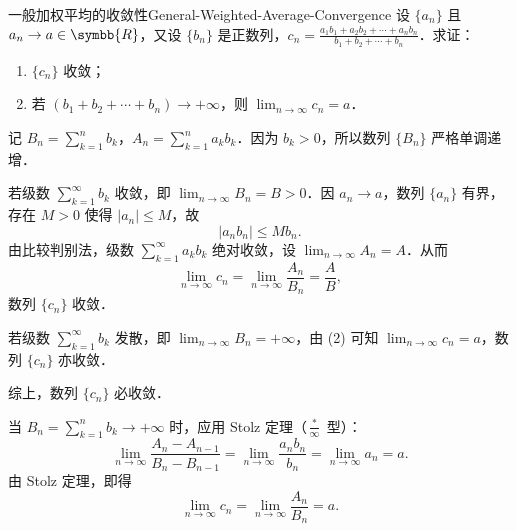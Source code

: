 \begin{problem}{一般加权平均的收敛性}{General-Weighted-Average-Convergence}
    设 $\{a_n\}$ 且 $a_n \to a \in \symbb{R}$，又设 $\{b_n\}$ 是正数列，$c_n = \frac{a_1 b_1 + a_2 b_2 + \cdots + a_n b_n}{b_1 + b_2 + \cdots + b_n}$．求证：
    \begin{enumerate}
        \item $\{c_n\}$ 收敛；
        \item 若 $(b_1 + b_2 + \cdots + b_n) \to +\infty$，则 $\lim_{n\to\infty} c_n = a$．
    \end{enumerate}
\end{problem}

\begin{myproof}

    记 $B_n = \sum_{k=1}^n b_k$，$A_n = \sum_{k=1}^n a_k b_k$．因为 $b_k > 0$，所以数列 $\{B_n\}$ 严格单调递增．

    若级数 $\sum_{k=1}^\infty b_k$ 收敛，即 $\lim_{n\to\infty} B_n = B > 0$．因 $a_n \to a$，数列 $\{a_n\}$ 有界，存在 $M > 0$ 使得 $|a_n| \leqslant M$，故
    \begin{equation}
        |a_n b_n| \leqslant M b_n.
    \end{equation}
    由比较判别法，级数 $\sum_{k=1}^\infty a_k b_k$ 绝对收敛，设 $\lim_{n\to\infty} A_n = A$．从而
    \begin{equation}
        \lim_{n\to\infty} c_n = \lim_{n\to\infty} \frac{A_n}{B_n} = \frac{A}{B},
    \end{equation}
    数列 $\{c_n\}$ 收敛．

    若级数 $\sum_{k=1}^\infty b_k$ 发散，即 $\lim_{n\to\infty} B_n = +\infty$，由 (2) 可知 $\lim_{n\to\infty} c_n = a$，数列 $\{c_n\}$ 亦收敛．

    综上，数列 $\{c_n\}$ 必收敛．


    当 $B_n = \sum_{k=1}^n b_k \to +\infty$ 时，应用 Stolz 定理（$\frac{*}{\infty}$ 型）：
    \begin{equation}
        \lim_{n\to\infty} \frac{A_n - A_{n-1}}{B_n - B_{n-1}} = \lim_{n\to\infty} \frac{a_n b_n}{b_n} = \lim_{n\to\infty} a_n = a.
    \end{equation}
    由 Stolz 定理，即得
    \begin{equation}
        \lim_{n\to\infty} c_n = \lim_{n\to\infty} \frac{A_n}{B_n} = a.
    \end{equation}
\end{myproof}

